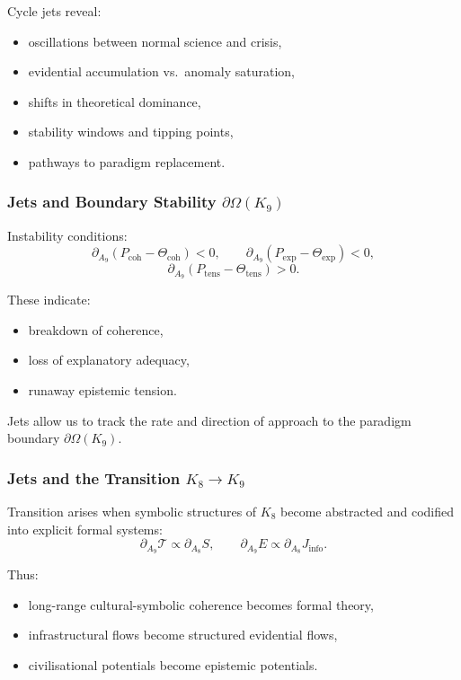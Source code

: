 Cycle jets reveal:
\begin{itemize}
    \item oscillations between normal science and crisis,
    \item evidential accumulation vs.\ anomaly saturation,
    \item shifts in theoretical dominance,
    \item stability windows and tipping points,
    \item pathways to paradigm replacement.
\end{itemize}


\subsubsection{Jets and Boundary Stability \texorpdfstring{$\partial\Omega(K_9)$}{\partial\Omega(K_9)}}

Instability conditions:
\[
\partial_{A_9}(P_{\mathrm{coh}}-\Theta_{\mathrm{coh}})<0,\qquad
\partial_{A_9}(P_{\mathrm{exp}}-\Theta_{\mathrm{exp}})<0,
\]
\[
\partial_{A_9}(P_{\mathrm{tens}}-\Theta_{\mathrm{tens}})>0.
\]

These indicate:
\begin{itemize}
    \item breakdown of coherence,
    \item loss of explanatory adequacy,
    \item runaway epistemic tension.
\end{itemize}

Jets allow us to track the rate and direction of approach to the
paradigm boundary $\partial\Omega(K_9)$.


\subsubsection{Jets and the Transition \texorpdfstring{$K_8 \to K_9$}{K_8 \to K_9}}

Transition arises when symbolic structures of $K_8$ become abstracted
and codified into explicit formal systems:
\[
\partial_{A_9}\mathcal{T}
\propto 
\partial_{A_8}S,
\qquad
\partial_{A_9}E
\propto
\partial_{A_8}J_{\mathrm{info}}.
\]

Thus:
\begin{itemize}
    \item long-range cultural-symbolic coherence becomes formal theory,
    \item infrastructural flows become structured evidential flows,
    \item civilisational potentials become epistemic potentials.
\end{itemize}


